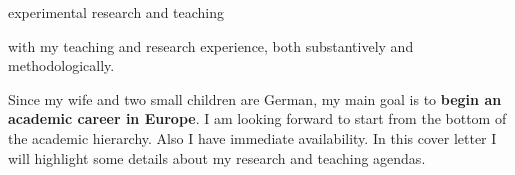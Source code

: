 \documentclass[10pt,stdletter,dateno,sigleft]{newlfm} %
\begin{document}
\begin{newlfm}
experimental research and teaching



with my teaching and research experience, both substantively and methodologically. 

Since my wife and two small children are German, my main goal is to {\bf begin an academic career in Europe}. I am looking forward to start from the bottom of the academic hierarchy. Also I have immediate availability. In this cover letter I will highlight some details about my research and teaching agendas.



{\unskip}


\vspace{-10cm}



\end{newlfm}
\end{document}
